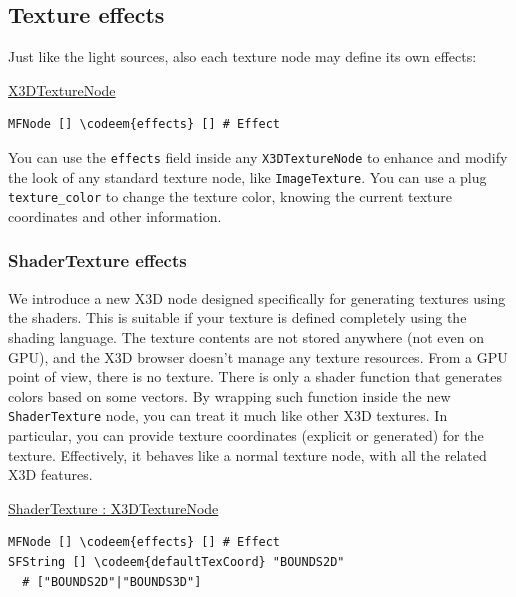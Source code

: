 \documentclass{egpubl}
\newenvironment{mycode}
{\begin{mycodecore}}
{\end{mycodecore}
\vspace{-0.1in}}
\newcommand*{\codeem}[1]{\textbf{#1}}
\begin{document}
\subsection{Texture effects}

Just like the light sources, also each texture node may define its own effects:

\begin{mycode}
\underline{X3DTextureNode}
\begin{Verbatim}[commandchars=\\\{\}]
MFNode [] \codeem{effects} [] # Effect
\end{Verbatim}
\end{mycode}

You can use the \texttt{effects} field
inside any \texttt{X3DTextureNode} to enhance and modify the look of any
standard texture node, like \texttt{ImageTexture}.
You can use a plug \texttt{texture\_color} to change the texture color,
knowing the current texture coordinates and other information.

\subsubsection{ShaderTexture effects}

We introduce a new X3D node designed specifically for generating
textures using the shaders. This is suitable
if your texture is defined completely using the shading language.
The texture contents are not stored anywhere (not even on GPU),
and the X3D browser doesn't manage any texture resources.
From a GPU point of view, there is no texture.
There is only a shader function that generates colors
based on some vectors. By wrapping such function inside
the new \texttt{ShaderTexture} node, you can treat it much like other X3D textures.
In particular, you can provide texture coordinates (explicit or generated)
for the texture.
Effectively, it behaves like a normal texture node, with all the related
X3D features.


\begin{mycode}
\underline{ShaderTexture : X3DTextureNode}
\begin{Verbatim}[commandchars=\\\{\}]
MFNode [] \codeem{effects} [] # Effect
SFString [] \codeem{defaultTexCoord} "BOUNDS2D"
  # ["BOUNDS2D"|"BOUNDS3D"]
\end{Verbatim}
\end{mycode}
\end{document}
